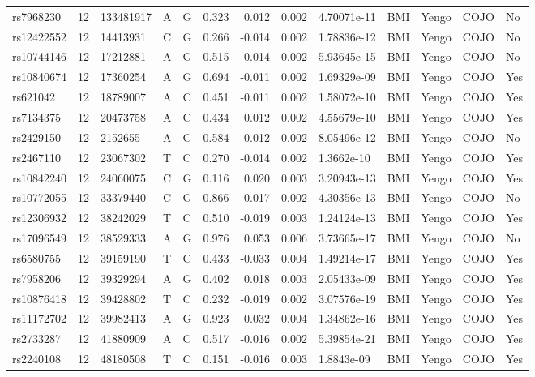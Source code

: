 \documentclass[11pt,twoside]{bristolthesis}
\begin{document}
\begin{longtable}[t]{lrlllrrrlllll}
\addlinespace
rs7968230 & 12 & 133481917 & A & G & 0.323 & 0.012 & 0.002 & 4.70071e-11 & BMI & Yengo & COJO & No\\
rs12422552 & 12 & 14413931 & C & G & 0.266 & -0.014 & 0.002 & 1.78836e-12 & BMI & Yengo & COJO & No\\
rs10744146 & 12 & 17212881 & A & G & 0.515 & -0.014 & 0.002 & 5.93645e-15 & BMI & Yengo & COJO & No\\
rs10840674 & 12 & 17360254 & A & G & 0.694 & -0.011 & 0.002 & 1.69329e-09 & BMI & Yengo & COJO & Yes\\
rs621042 & 12 & 18789007 & A & C & 0.451 & -0.011 & 0.002 & 1.58072e-10 & BMI & Yengo & COJO & Yes\\
\addlinespace
rs7134375 & 12 & 20473758 & A & C & 0.434 & 0.012 & 0.002 & 4.55679e-10 & BMI & Yengo & COJO & Yes\\
rs2429150 & 12 & 2152655 & A & C & 0.584 & -0.012 & 0.002 & 8.05496e-12 & BMI & Yengo & COJO & No\\
rs2467110 & 12 & 23067302 & T & C & 0.270 & -0.014 & 0.002 & 1.3662e-10 & BMI & Yengo & COJO & Yes\\
rs10842240 & 12 & 24060075 & C & G & 0.116 & 0.020 & 0.003 & 3.20943e-13 & BMI & Yengo & COJO & Yes\\
rs10772055 & 12 & 33379440 & C & G & 0.866 & -0.017 & 0.002 & 4.30356e-13 & BMI & Yengo & COJO & No\\
\addlinespace
rs12306932 & 12 & 38242029 & T & C & 0.510 & -0.019 & 0.003 & 1.24124e-13 & BMI & Yengo & COJO & Yes\\
rs17096549 & 12 & 38529333 & A & G & 0.976 & 0.053 & 0.006 & 3.73665e-17 & BMI & Yengo & COJO & No\\
rs6580755 & 12 & 39159190 & T & C & 0.433 & -0.033 & 0.004 & 1.49214e-17 & BMI & Yengo & COJO & Yes\\
rs7958206 & 12 & 39329294 & A & G & 0.402 & 0.018 & 0.003 & 2.05433e-09 & BMI & Yengo & COJO & Yes\\
rs10876418 & 12 & 39428802 & T & C & 0.232 & -0.019 & 0.002 & 3.07576e-19 & BMI & Yengo & COJO & Yes\\
\addlinespace
rs11172702 & 12 & 39982413 & A & G & 0.923 & 0.032 & 0.004 & 1.34862e-16 & BMI & Yengo & COJO & Yes\\
rs2733287 & 12 & 41880909 & A & C & 0.517 & -0.016 & 0.002 & 5.39854e-21 & BMI & Yengo & COJO & Yes\\
rs2240108 & 12 & 48180508 & T & C & 0.151 & -0.016 & 0.003 & 1.8843e-09 & BMI & Yengo & COJO & Yes\\

\end{longtable}
\end{document}
